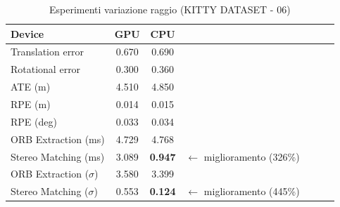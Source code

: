 \documentclass[12pt,a4paper]{report}
\begin{document}
\begin{table}[h]
    \centering
    \caption{Esperimenti variazione raggio (KITTY DATASET - 06) }
    \begin{tabular}{lcccccc}
        \toprule
        \rowcolor{gray!20}
        Device & \cellcolor{blue!20}GPU & \cellcolor{orange!20}CPU  \\
        \midrule
        Translation error & \cellcolor{green!20}0.670 & 0.690  \\
        Rotational error  & \cellcolor{green!20}0.300 & 0.360  \\
        ATE (m)           & \cellcolor{green!20}4.510 & 4.850  \\
        RPE (m)           & \cellcolor{green!20}0.014 & 0.015  \\
        RPE (deg)         & \cellcolor{green!20}0.033 & 0.034  \\
        ORB Extraction (ms) & \cellcolor{green!20}4.729 & 4.768 &&  \\
        Stereo Matching (ms) & 3.089 & \cellcolor{green!20}\textbf{0.947} & $\xleftarrow{}$ miglioramento (326\%) \\
        ORB Extraction ($\sigma$) & 3.580 & \cellcolor{green!20}3.399  \\
        Stereo Matching ($\sigma$) & 0.553 & \cellcolor{green!20}\textbf{0.124} & $\xleftarrow{}$ miglioramento (445\%) \\
        \bottomrule
    \end{tabular}
\end{table}
\end{document}
